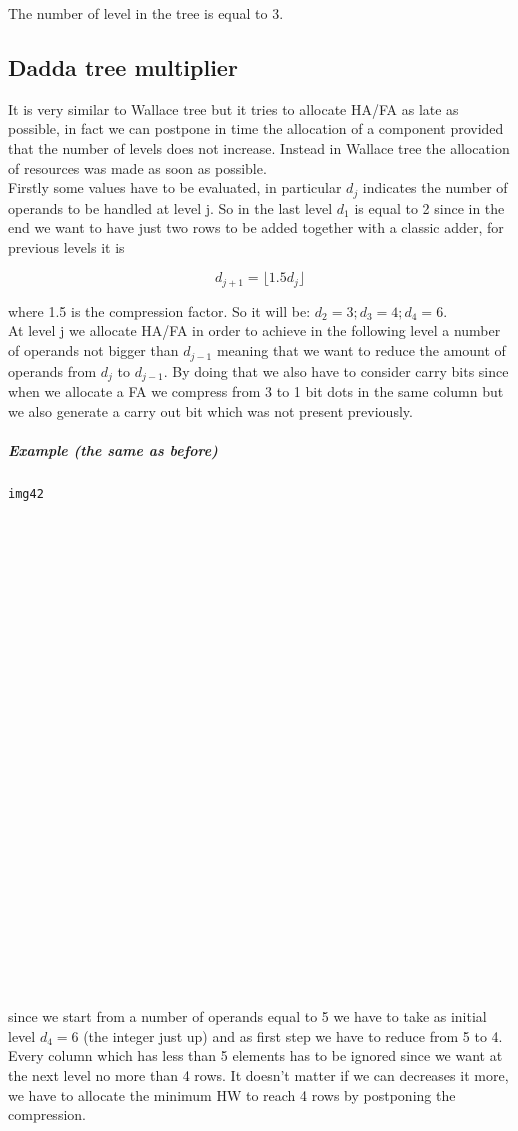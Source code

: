 The number of level in the tree is equal to 3.

\subsection{Dadda tree multiplier}
It is very similar to Wallace tree but it tries to allocate HA/FA as late as possible, in fact we can postpone in time the allocation of a component provided that the number of levels does not increase. Instead in Wallace tree the allocation of resources was made as soon as possible.\\

Firstly some values have to be evaluated, in particular $d_j$ indicates the number of operands to be handled at level j. So in the last level $d_1$ is equal to 2 since in the end we want to have just two rows to be added together with a classic adder, for previous levels it is

$$d_{j+1} = \lfloor 1.5 d_j \rfloor$$

where 1.5 is the compression factor. So it will be: $d_2=3; d_3=4; d_4=6$.\\

At level j we allocate HA/FA in order to achieve in the following level a number of operands not bigger than $d_{j-1}$ meaning that we want to reduce the amount of operands from $d_j$ to $d_{j-1}$. By doing that we also have to consider carry bits since when we allocate a FA we compress from 3 to 1 bit dots in the same column but we also generate a carry out bit which was not present previously.

\subparagraph{Example (the same as before)}

\begin{verbatim}
img42


























\end{verbatim}

since we start from a number of operands equal to 5 we have to take as initial level $d_4=6$ (the integer just up) and as first step we have to reduce from 5 to 4. Every column which has less than 5 elements has to be ignored since we want at the next level no more than 4 rows. It doesn't matter if we can decreases it more, we have to allocate the minimum HW to reach 4 rows by postponing the compression.\\

